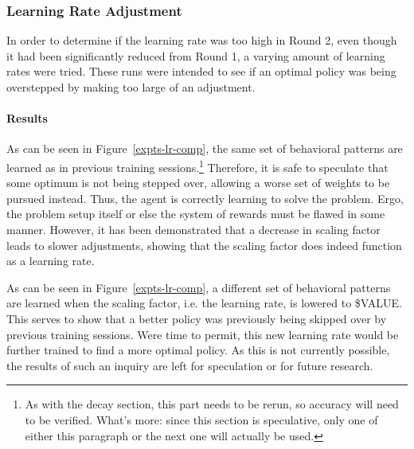 
\subsubsection*{Learning Rate Adjustment}
\label{sec:findings-expts-learnrate}

In order to determine if the learning rate was too high in Round 2,
even though it had been significantly reduced from Round 1,
a varying amount of learning rates were tried.
%
These runs were intended to see if an optimal policy was being overstepped by
making too large of an adjustment.


\paragraph*{Results}




As can be seen in Figure~\ref{expts-lr-comp},
the same set of behavioral patterns are learned as in previous training
sessions.\footnote{
	As with the decay section,
	this part needs to be rerun,
	so accuracy will need to be verified.
	What's more: since this section is speculative,
	only one of either this paragraph or the next one will actually be used.
}
%
Therefore,
it is safe to speculate that some optimum is not being stepped over,
allowing a worse set of weights to be pursued instead.
%
Thus,
the agent is correctly learning to solve the problem.
%
Ergo,
the problem setup itself or else the system of rewards
must be flawed in some manner.
%
However,
it has been demonstrated that
a decrease in scaling factor leads to slower adjustments,
showing that the scaling factor does indeed function as a learning rate.


As can be seen in Figure~\ref{expts-lr-comp},
a different set of behavioral patterns are learned when the
scaling factor,
i.e. the learning rate,
is lowered to \${VALUE}. %
%
This serves to show that a better policy was previously being skipped over
by previous training sessions.
%
Were time to permit,
this new learning rate would be further trained to find a more optimal
policy.
%
As this is not currently possible,
the results of such an inquiry are left for speculation
or for future research.



